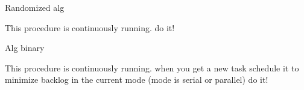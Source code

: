 \documentclass{article}[11pt]
\begin{document}
\begin{algorithm}
  \caption{Randomized alg}
  \begin{algorithmic}[1]
    \State This procedure is continuously running.
    \State 
      \State do it!
    \EndIf
    \EndProcedure
  \end{algorithmic}
\end{algorithm}

\begin{algorithm}
  \caption{Alg binary}
  \begin{algorithmic}[1]
    \State This procedure is continuously running.
    \State when you get a new task schedule it to minimize
    backlog in the current mode (mode is serial or parallel)
      \State do it!
    \EndIf
    \EndProcedure
  \end{algorithmic}
\end{algorithm}
\end{document}
